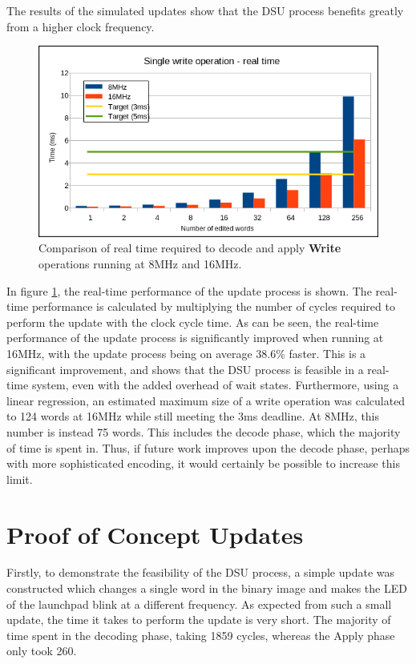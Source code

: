 The results of the simulated updates show that the DSU process benefits greatly from a higher clock frequency. 
\begin{figure}[!ht]
    \begin{shaded}
        \centering
        \includegraphics[width=\figurewidth]{img/W8vs16_rt.png}
        \caption{Comparison of real time required to decode and apply \textbf{Write} operations running at 8MHz and 16MHz.}
        \label{fig:s8vs16}
    \end{shaded}
\end{figure}

In figure \ref{fig:s8vs16}, the real-time performance of the update process is shown. The real-time performance is calculated by multiplying the number of cycles required to perform the update with the clock cycle time. As can be seen, the real-time performance of the update process is significantly improved when running at 16MHz, with the update process being on average $38.6\%$ faster. This is a significant improvement, and shows that the DSU process is feasible in a real-time system, even with the added overhead of wait states. Furthermore, using a linear regression, an estimated maximum size of a write operation was calculated to 124 words at 16MHz while still meeting the 3ms deadline. At 8MHz, this number is instead 75 words. This includes the decode phase, which the majority of time is spent in. Thus, if future work improves upon the decode phase, perhaps with more sophisticated encoding, it would certainly be possible to increase this limit.

\section{Proof of Concept Updates}
Firstly, to demonstrate the feasibility of the DSU process, a simple update was constructed which changes a single word in the binary image and makes the LED of the launchpad blink at a different frequency. As expected from such a small update, the time it takes to perform the update is very short. The majority of time spent in the decoding phase, taking 1859 cycles, whereas the Apply phase only took 260. 

